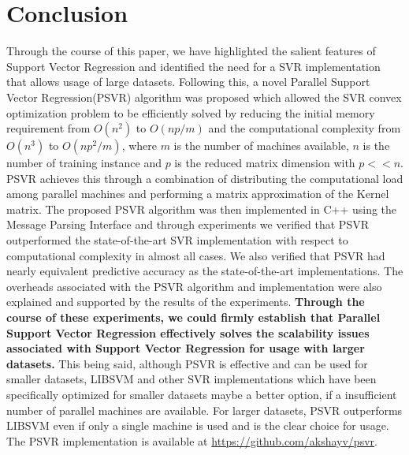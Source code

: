 \documentclass[12pt]{article}
\begin{document}
\section{Conclusion}
Through the course of this paper, we have highlighted the salient features of Support Vector Regression and identified the need for a SVR implementation that allows usage of large datasets. Following this, a novel Parallel Support Vector Regression(PSVR) algorithm was proposed which  allowed the SVR convex optimization problem to be efficiently solved by reducing the initial memory requirement from $O(n^2)$ to $O(np/m)$ and the computational complexity from $O(n^3)$ to $O(np^2/m)$,  where $m$ is the number of machines available, $n$ is the number of training instance and $p$ is the reduced matrix dimension with $p << n$. PSVR  achieves this through a combination of distributing the computational load among parallel machines and performing a matrix approximation of the Kernel matrix.
\newline\newline
The proposed PSVR algorithm was then implemented in C++ using the Message Parsing Interface and through experiments we verified that PSVR outperformed the state-of-the-art SVR implementation with respect to computational complexity in almost all cases. We also verified that PSVR had nearly equivalent predictive accuracy as the state-of-the-art implementations. The overheads associated with the PSVR algorithm and implementation were also explained and supported by the results of the experiments. 
\newline
\newline
{\bf Through the course of these experiments, we could firmly establish that Parallel Support Vector Regression effectively solves the scalability issues associated with Support Vector Regression for usage with larger datasets.}
\newline
\newline
This being said, although PSVR is effective and can be used for smaller datasets, LIBSVM and other SVR implementations which have been specifically optimized for smaller datasets maybe a better option, if a insufficient number of parallel machines are available. For larger datasets, PSVR outperforms LIBSVM even if only a single machine is used and is the clear choice for usage.
\newline\newline
The PSVR implementation is available at \url{https://github.com/akshayv/psvr}. 
\end{document}
